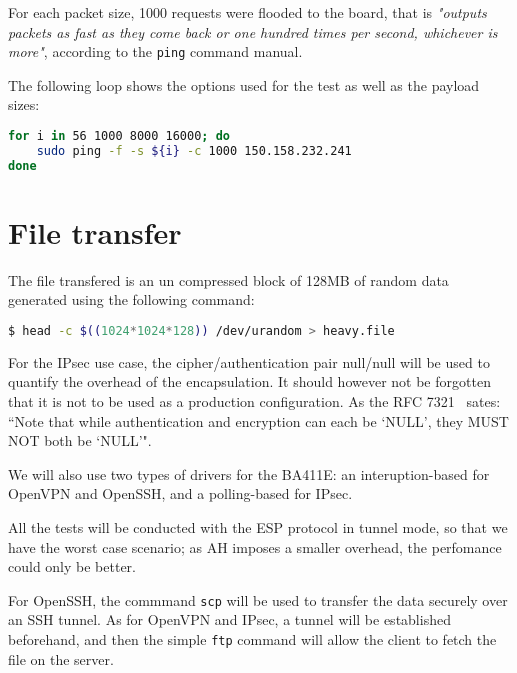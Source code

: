 \noindent For each packet size, 1000 requests were flooded to the board, that is \textit{"outputs packets as fast as they come back or one hundred times per second, whichever is more"}, according to the \texttt{ping} command manual.

The following loop shows the options used for the test as well as the payload sizes:
\begin{lstlisting}[language=bash]
for i in 56 1000 8000 16000; do
	sudo ping -f -s ${i} -c 1000 150.158.232.241
done
\end{lstlisting}

\section{File transfer}
The file transfered is an un compressed block of 128MB of random data generated using the following command:
\begin{lstlisting}[language=bash]
  $ head -c $((1024*1024*128)) /dev/urandom > heavy.file
\end{lstlisting}

For the IPsec use case, the cipher/authentication pair null/null will be used to quantify the overhead of the encapsulation.
It should however not be forgotten that it is not to be used as a production configuration.
As the RFC 7321~\citep[pg. 7]{rfc7321} sates: ``Note that while authentication and encryption can each
   be `NULL', they MUST NOT both be `NULL'".

We will also use two types of drivers for the BA411E: an interuption-based for OpenVPN and OpenSSH, and a polling-based for IPsec.

All the tests will be conducted with the ESP protocol in tunnel mode, so that we have the worst case scenario; as AH imposes a smaller overhead, the perfomance could only be better.

For OpenSSH, the commmand \texttt{scp} will be used to transfer the data securely over an SSH tunnel.
As for OpenVPN and IPsec, a tunnel will be established beforehand, and then the simple \texttt{ftp} command will allow the client to fetch the file on the server.